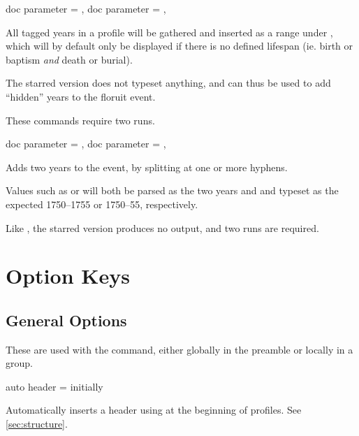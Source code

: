 \documentclass[
	a4paper,
]{article}
\begin{document}
\begin{docCommands}[
		doc name = {gprYear}
	]
	{
		{ doc parameter = {}},
		{ doc parameter = {\sarg{}}},
	}

	All tagged years in a profile will be gathered and inserted as a  range under , which will by default only be displayed if there is no defined lifespan (ie. birth or baptism \emph{and} death or burial).
	
	The starred version does not typeset anything, and can thus be used to add \enquote{hidden} years to the floruit event.

	These commands require two runs.
\end{docCommands}


\begin{docCommands}[
		doc name = {gprYears}
	]
	{
		{ doc parameter = {}},
		{ doc parameter = {\sarg{}}},
	}

	Adds two years to the  event, by splitting at one or more hyphens.

	Values such as  or  will both be parsed as the two years  and  and typeset as the expected 1750--1755 or 1750--55, respectively.

	Like , the starred version produces no output, and two runs are required.
\end{docCommands}

\clearpage
\section{Option Keys} %

\subsection{General Options} %

\label{sec:genconf}
These are used with the  command, either globally in the preamble or locally in a group.

\begin{docKey}
	{auto header}
	{=}
	{initially }

	Automatically inserts a header using  at the beginning of profiles. See \cref{sec:structure}.
\end{docKey}
\end{document}

